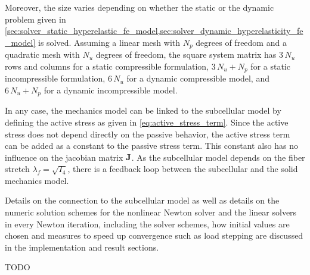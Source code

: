 Moreover, the size varies depending on whether the static or the dynamic problem given in \cref{sec:solver_static_hyperelastic_fe_model,sec:solver_dynamic_hyperelasticity_fe_model} is solved. Assuming a linear mesh with $N_p$ degrees of freedom and a quadratic mesh with $N_u$ degrees of freedom, the square system matrix has $3\,N_u$ rows and columns for a static compressible formulation, $3\,N_u + N_p$ for a static incompressible formulation, $6\,N_u$ for a dynamic compressible model, and $6\,N_u+N_p$ for a dynamic incompressible model.



In any case, the mechanics model can be linked to the subcellular model by defining the active stress as given in \cref{eq:active_stress_term}. Since the active stress does not depend directly on the passive behavior, the active stress term can be added as a constant to the passive stress term. This constant also has no influence on the jacobian matrix $\textbf{J}$. As the subcellular model depends on the fiber stretch $\lambda_f = \sqrt{I_4}$, there is a feedback loop between the subcellular and the solid mechanics model.

Details on the connection to the subcellular model as well as details on the numeric solution schemes for the nonlinear Newton solver and the linear solvers in every Newton iteration, including the solver schemes, how initial values are chosen and measures to speed up convergence such as load stepping are discussed in the implementation and result sections.

TODO



